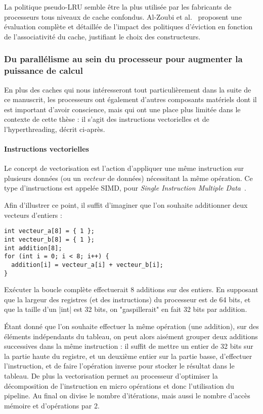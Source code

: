 La politique pseudo-LRU semble être la plus utilisée par les fabricants de processeurs tous niveaux de cache confondus. Al-Zoubi et al.~\cite{Al-Zoubi2004} proposent une évaluation complète et détaillée de l'impact des politiques d'éviction en fonction de l'associativité du cache, justifiant le choix des constructeurs.



\subsubsection{Du parallélisme au sein du processeur pour augmenter la puissance de calcul}\label{sec:context:numa:node}

En plus des caches qui nous intéresseront tout particulièrement dans la suite de ce manuscrit, les processeurs ont également d'autres composants matériels dont il est important d'avoir conscience, mais qui ont une place plus limitée dans le contexte de cette thèse : il s'agit des instructions vectorielles et de l'hyperthreading, décrit ci-après.

\paragraph{Instructions vectorielles}\label{sec:context:numa:simd}

Le concept de vectorisation est l'action d'appliquer une même instruction sur plusieurs données (ou un \emph{vecteur} de données) nécessitant la même opération.
Ce type d'instructions est appelée SIMD, pour \emph{Single Instruction Multiple Data}~\cite{Flynn1966}.

Afin d'illustrer ce point, il suffit d'imaginer que l'on souhaite additionner deux vecteurs d'entiers :
\begin{lstlisting}
int vecteur_a[8] = { 1 };
int vecteur_b[8] = { 1 };
int addition[8];
for (int i = 0; i < 8; i++) {
  addition[i] = vecteur_a[i] + vecteur_b[i];
}
\end{lstlisting}

Exécuter la boucle complète effectuerait 8 additions sur des entiers.
En supposant que la largeur des registres (et des instructions) du processeur est de 64 bits, et que la taille d'un |int| est 32 bits, on "gaspillerait" en fait 32 bits par addition.

Étant donné que l'on souhaite effectuer la même opération (une addition), sur des éléments indépendants du tableau, on peut alors aisément grouper deux additions successives dans la même instruction : il suffit de mettre un entier de 32 bits sur la partie haute du registre, et un deuxième entier sur la partie basse, d'effectuer l'instruction, et de faire l'opération inverse pour stocker le résultat dans le tableau.
De plus la vectorisation permet au processeur d'optimiser la décomposition de l'instruction en micro opérations et donc l'utilisation du pipeline.
Au final on divise le nombre d'itérations, mais aussi le nombre d'accès mémoire et d'opérations par 2.


